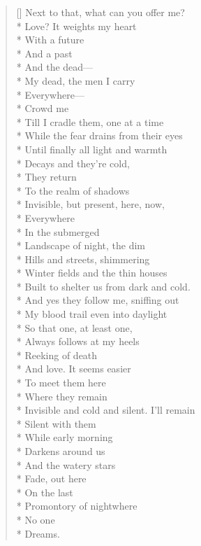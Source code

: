 \begin{verse}[\versewidth]
Next to that, what can you offer me?\\*
Love? It weights my heart\\*
With a future \\*
And a past\\*
And the dead---\\*
My dead, the men I carry\\*
Everywhere---\\*
Crowd me\\*
Till I cradle them, one at a time\\*
While the fear drains from their eyes\\*
Until finally all light and warmth\\*
Decays and they're cold,\\*
They return\\*
To the realm of shadows\\*
Invisible, but present, here, now,\\*
Everywhere\\*
In the submerged \\*
Landscape of night, the dim \\*
Hills and streets, shimmering\\*
Winter fields and the thin houses\\*
Built to shelter us from dark and cold.\\*
And yes they follow me, sniffing out\\*
My blood trail even into daylight\\*
So that one, at least one,\\*
Always follows at my heels\\*
Reeking of death\\*
And love.   It seems easier\\*
To meet them here\\*
Where they remain\\*
Invisible and cold and silent.   I'll remain\\*
Silent with them\\*
While early morning\\*
Darkens around us\\*
And the watery stars\\*
Fade, out here\\*
On the last \\*
Promontory of night\qquad where \\*
No one \\*
Dreams.
\end{verse}
